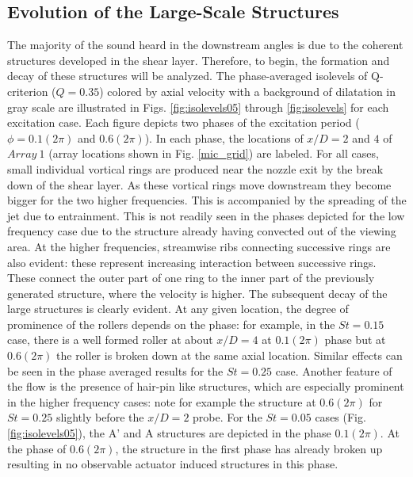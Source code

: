 \documentclass[english]{aiaa-tc}
\begin{document}
\subsection{Evolution of the Large-Scale Structures}\label{structure}
The majority of the sound heard in the downstream angles is due to the coherent structures developed in the shear layer. Therefore, to begin, the formation and decay of these structures will be analyzed. The phase-averaged isolevels of Q-criterion ($Q=0.35$) colored by axial velocity with a background of dilatation in gray scale are illustrated in Figs. \ref{fig:isolevels05} through \ref{fig:isolevels} for each excitation case. Each figure depicts two phases of the excitation period ($\phi =0.1(2\pi)$ and $0.6(2\pi)$). In each phase, the locations of $x/D=2$ and $4$ of $Array~1$ (array locations shown in Fig. \ref{mic_grid}) are labeled. 
For all cases, small individual vortical rings are produced near the
nozzle exit by the break down of the shear layer. As these vortical
rings move downstream they become bigger for the two higher
frequencies.  This is accompanied by the spreading of the jet due to
entrainment.  This is not readily seen in the phases depicted for the low frequency case due to the structure already having convected out of the viewing area. At the higher frequencies, streamwise ribs connecting
successive rings are also evident\cite{gdv2011-POF}: these represent
increasing interaction between successive rings.  These connect the
outer part of one ring to the inner part of the previously generated
structure, where the velocity is higher.  The subsequent decay of
the large structures is clearly evident.  At any given location, the
degree of prominence of the rollers depends on the phase: for example,
in the $St=0.15$ case, there is a well formed roller at about $x/D=4$ at
$0.1(2\pi)$ phase but at $0.6(2\pi)$ the roller is broken
down at the same axial location.  Similar effects can be seen in the
phase averaged results for the $St=0.25$ case. Another feature of the
flow is the presence of hair-pin like structures, which are especially
prominent in the higher frequency cases: note for example the
structure at $0.6(2\pi)$ for $St=0.25$ slightly before the $x/D=2$
probe.
For the $St=0.05$ cases (Fig. \ref{fig:isolevels05}), the A' and A structures are depicted in the phase $0.1(2\pi)$. At the phase of $0.6(2\pi)$, the structure in the first phase has already broken up resulting in no observable actuator induced structures in this phase. 
\end{document}
